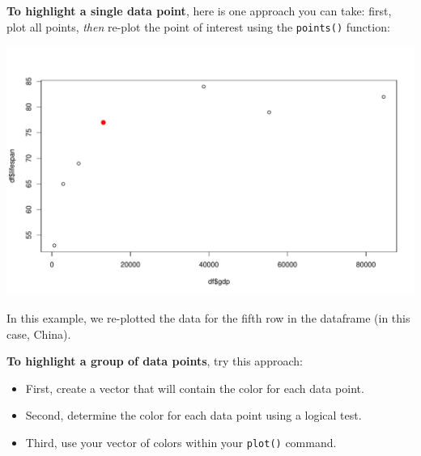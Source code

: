 \documentclass[
]{book}
\newenvironment{Shaded}{\begin{snugshade}}{\end{snugshade}}
\newcommand{\DataTypeTok}[1]{\textcolor[rgb]{0.13,0.29,0.53}{#1}}
\newcommand{\DecValTok}[1]{\textcolor[rgb]{0.00,0.00,0.81}{#1}}
\newcommand{\FloatTok}[1]{\textcolor[rgb]{0.00,0.00,0.81}{#1}}
\newcommand{\KeywordTok}[1]{\textcolor[rgb]{0.13,0.29,0.53}{\textbf{#1}}}
\newcommand{\NormalTok}[1]{#1}
\newcommand{\OperatorTok}[1]{\textcolor[rgb]{0.81,0.36,0.00}{\textbf{#1}}}
\newcommand{\StringTok}[1]{\textcolor[rgb]{0.31,0.60,0.02}{#1}}
\begin{document}
\textbf{To highlight a single data point}, here is one approach you can take: first, plot all points, \emph{then} re-plot the point of interest using the \texttt{points()} function:

\begin{Shaded}
\end{Shaded}

\includegraphics{figures/unnamed-chunk-123-1.pdf}

In this example, we re-plotted the data for the fifth row in the dataframe (in this case, China).

\textbf{To highlight a group of data points}, try this approach:

\begin{itemize}
\item
  First, create a vector that will contain the color for each data point.
\item
  Second, determine the color for each data point using a logical test.
\item
  Third, use your vector of colors within your \texttt{plot()} command.
\end{itemize}
\end{document}
